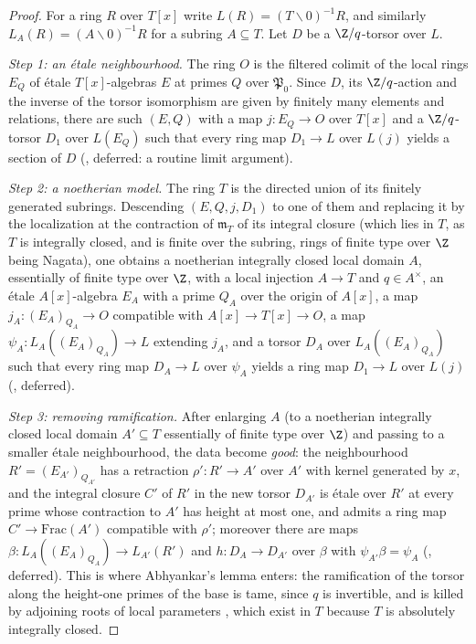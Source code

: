 \begin{proof}
For a ring $R$ over $T[x]$ write $L(R)=(T\smallsetminus0)^{-1}R$, and similarly $L_A(R)=(A\smallsetminus0)^{-1}R$ for a subring
$A\subseteq T$. Let $D$ be a $\Z/q$-torsor over $L$.

\emph{Step 1: an \'etale neighbourhood.} The ring $O$ is the filtered colimit of the local rings $E_Q$ of \'etale
$T[x]$-algebras $E$ at primes $Q$ over $\mathfrak P_0$. Since $D$, its $\Z/q$-action and the inverse of the torsor
isomorphism are given by finitely many elements and relations, there are such $(E,Q)$ with a map $j\colon E_Q\to O$ over
$T[x]$ and a $\Z/q$-torsor $D_1$ over $L(E_Q)$ such that every ring map $D_1\to L$ over $L(j)$ yields a section of $D$
(, deferred: a routine limit argument).

\emph{Step 2: a noetherian model.} The ring $T$ is the directed union of its finitely generated subrings. Descending
$(E,Q,j,D_1)$ to one of them and replacing it by the localization at the contraction of $\mathfrak m_T$ of its integral
closure (which lies in $T$, as $T$ is integrally closed, and is finite over the subring, rings of finite type over $\Z$
being Nagata), one obtains a noetherian integrally closed local domain $A$, essentially of finite type over $\Z$, with a
local injection $A\to T$ and $q\in A^\times$, an \'etale $A[x]$-algebra $E_A$ with a prime $Q_A$ over the origin of $A[x]$,
a map $j_A\colon(E_A)_{Q_A}\to O$ compatible with $A[x]\to T[x]\to O$, a map $\psi_A\colon L_A((E_A)_{Q_A})\to L$ extending
$j_A$, and a torsor $D_A$ over $L_A((E_A)_{Q_A})$ such that every ring map $D_A\to L$ over $\psi_A$ yields a ring map
$D_1\to L$ over $L(j)$ (, deferred).

\emph{Step 3: removing ramification.} After enlarging $A$ (to a noetherian integrally closed local domain $A'\subseteq T$
essentially of finite type over $\Z$) and passing to a smaller \'etale neighbourhood, the data become \emph{good}: the
neighbourhood $R'=(E_{A'})_{Q_{A'}}$ has a retraction $\rho'\colon R'\to A'$ over $A'$ with kernel generated by $x$, and the
integral closure $C'$ of $R'$ in the new torsor $D_{A'}$ is \'etale over $R'$ at every prime whose contraction to $A'$ has
height at most one, and admits a ring map $C'\to\mathrm{Frac}(A')$ compatible with $\rho'$; moreover there are maps
$\beta\colon L_A((E_A)_{Q_A})\to L_{A'}(R')$ and $h\colon D_A\to D_{A'}$ over $\beta$ with $\psi_{A'}\beta=\psi_A$
(, deferred). This is where Abhyankar's lemma enters:
the ramification of the torsor along the height-one primes of the base is tame, since $q$ is invertible, and is killed
by adjoining roots of local parameters \cite[Exp.~X, 3.6]{Grothendieck1971}, which exist in $T$ because $T$ is absolutely
integrally closed.


\end{proof}
